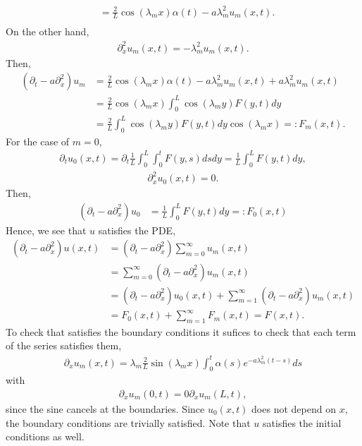 \begin{questions}
\begin{solution}
\begin{align*}
&=\frac{2}{L}\cos(\lambda_mx)\alpha(t)-a\lambda_m^2u_m(x,t).\\
\end{align*}
On the other hand,
\begin{align*}
\partial^2_xu_m(x,t)=-\lambda_m^2u_m(x,t).
\end{align*}
Then,
\begin{align*}
(\partial_t-a\partial_x^2)u_m&=\frac{2}{L}\cos(\lambda_mx)\alpha(t)-a\lambda_m^2u_m(x,t)+a\lambda_m^2u_m(x,t)\\
&=\frac{2}{L}\cos(\lambda_mx)\int_0^L\cos(\lambda_my)F(y,t)dy\\
&=\frac{2}{L}\int_0^L\cos(\lambda_my)F(y,t)dy\cos(\lambda_mx)=:F_m(x,t).
\end{align*}
For the case of $m=0$,
\begin{align*}
\partial_tu_0(x,t)=\partial_t\frac{1}{L}\int_0^L\int_0^tF(y,s)dsdy=\frac{1}{L}\int_0^LF(y,t)dy,
\end{align*}
\begin{align*}
\partial_x^2u_0(x,t)=0.
\end{align*}
Then,
\begin{align*}
(\partial_t-a\partial_x^2)u_0&=\frac{1}{L}\int_0^LF(y,t)dy=:F_0(x,t)
\end{align*}
Hence, we see that $u$ satisfies the PDE,
\begin{align*}
(\partial_t-a\partial_x^2)u(x,t)&=(\partial_t-a\partial_x^2)\sum_{m=0}^{\infty}u_m(x,t)\\
&=\sum_{m=0}^{\infty}(\partial_t-a\partial_x^2)u_m(x,t)\\
&=(\partial_t-a\partial_x^2)u_0(x,t)+\sum_{m=1}^{\infty}(\partial_t-a\partial_x^2)u_m(x,t)\\
&=F_0(x,t)+\sum_{m=1}^{\infty}F_m(x,t)
=F(x,t).
\end{align*}
To check that satisfies the boundary conditions it sufices to check that each term of the series satisfies them,
\begin{align*}
\partial_xu_m(x,t)=\lambda_m\frac{2}{L}\sin(\lambda_mx)\int_0^t\alpha(s)e^{-a\lambda_m^2(t-s)}ds
\end{align*}
with
\begin{align*}
\partial_xu_m(0,t)=0\partial_xu_m(L,t),
\end{align*}
since the sine cancels at the boundaries. Since $u_0(x,t)$ does not depend on $x$, the boundary conditions are trivially satisfied. Note that $u$ satisfies the initial conditions as well.
\end{solution}
\end{questions}